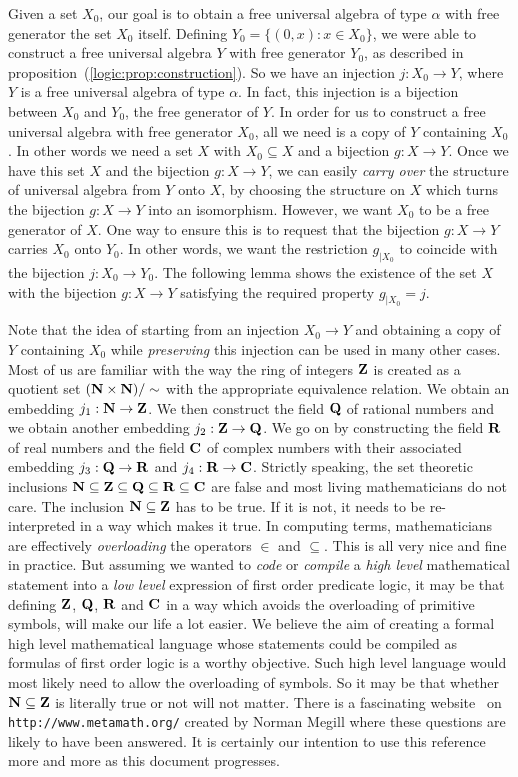 Given a set $X_{0}$, our goal is to obtain a free universal algebra
of type $\alpha$ with free generator the set $X_{0}$ itself.
Defining $Y_{0}=\{(0,x):x\in X_{0}\}$, we were able to construct a
free universal algebra $Y$ with free generator $Y_{0}$, as described
in proposition~(\ref{logic:prop:construction}). So we have an
injection $j:X_{0}\to Y$, where $Y$ is a free universal algebra of
type $\alpha$. In fact, this injection is a bijection between
$X_{0}$ and $Y_{0}$, the free generator of $Y$. In order for us to
construct a free universal algebra with free generator $X_{0}$, all
we need is a copy of $Y$ containing $X_{0}$. In other words we need
a set $X$ with $X_{0}\subseteq X$ and a bijection $g:X\to Y$. Once
we have this set $X$ and the bijection $g:X\to Y$, we can easily
{\em carry over} the structure of universal algebra from $Y$ onto
$X$, by choosing the structure on $X$ which turns the bijection
$g:X\to Y$ into an isomorphism. However, we want $X_{0}$ to be a
free generator of $X$. One way to ensure this is to request that the
bijection $g:X\to Y$ carries $X_{0}$ onto $Y_{0}$. In other words,
we want the restriction $g_{|X_{0}}$ to coincide with the bijection
$j:X_{0}\to Y_{0}$. The following lemma shows the existence of the
set $X$ with the bijection $g:X\to Y$ satisfying the required
property $g_{|X_{0}}=j$.


Note that the idea of starting from an injection $X_{0}\to Y$ and
obtaining a copy of $Y$ containing $X_{0}$ while {\em preserving}
this injection can be used in many other cases. Most of us are
familiar with the way the ring of integers $\mbox{$\bf Z$}$ is created as a
quotient set $(\mbox{$\bf N$}\times\mbox{$\bf N$})/\sim$ with the appropriate equivalence
relation. We obtain an embedding $j_{1}:\mbox{$\bf N$}\to\mbox{$\bf Z$}$. We then construct
the field $\mbox{$\bf Q$}$ of rational numbers and we obtain another embedding
$j_{2}:\mbox{$\bf Z$}\to\mbox{$\bf Q$}$. We go on by constructing the field $\mbox{$\bf R$}$ of real
numbers and the field $\mbox{$\bf C$}$ of complex numbers with their associated
embedding $j_{3}:\mbox{$\bf Q$}\to\mbox{$\bf R$}$ and $j_{4}:\mbox{$\bf R$}\to\mbox{$\bf C$}$. Strictly speaking,
the set theoretic inclusions
$\mbox{$\bf N$}\subseteq\mbox{$\bf Z$}\subseteq\mbox{$\bf Q$}\subseteq\mbox{$\bf R$}\subseteq\mbox{$\bf C$}$ are false and most
living mathematicians do not care. The inclusion $\mbox{$\bf N$}\subseteq\mbox{$\bf Z$}$ has
to be true. If it is not, it needs to be re-interpreted in a way
which makes it true. In computing terms, mathematicians are
effectively {\em overloading} the operators $\in$ and $\subseteq$.
This is all very nice and fine in practice. But assuming we wanted
to {\em code} or {\em compile} a {\em high level} mathematical
statement into a {\em low level} expression of first order predicate
logic, it may be that defining $\mbox{$\bf Z$}$, $\mbox{$\bf Q$}$, $\mbox{$\bf R$}$ and $\mbox{$\bf C$}$ in a way
which avoids the overloading of primitive symbols, will make our
life a lot easier. We believe the aim of creating a formal high
level mathematical language whose statements could be compiled as
formulas of first order logic is a worthy objective. Such high level
language would most likely need to allow the overloading of symbols.
So it may be that whether $\mbox{$\bf N$}\subseteq\mbox{$\bf Z$}$ is literally true or not
will not matter. There is a fascinating website~\cite{Metamath} on
\texttt{http://www.metamath.org/} created by Norman Megill where
these questions are likely to have been answered. It is certainly
our intention to use this reference more and more as this document
progresses.

